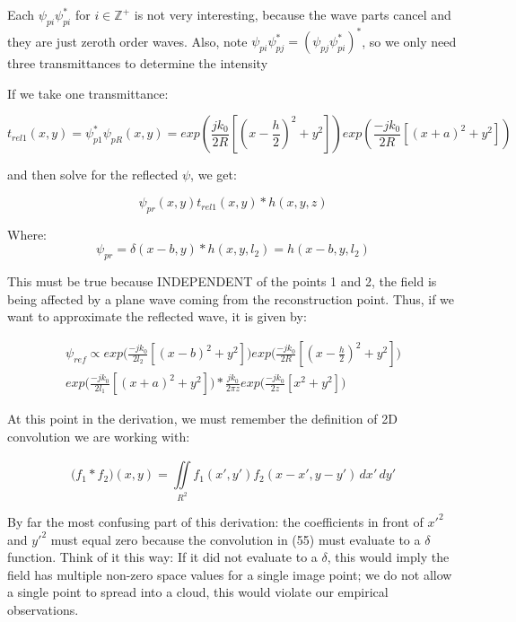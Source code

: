 \documentclass[12pt]{article}
\begin{document}
Each \(\psi_{pi}\psi_{pi}^*\) for \(i \in \mathbb{Z}^+\) is not very interesting, because the wave parts cancel and they are just zeroth order waves.
Also, note \(\psi_{pi}\psi_{pj}^* = (\psi_{pj}\psi_{pi}^*)^* \), so we only need three transmittances to determine the intensity

If we take one transmittance:

\begin{equation}
	t_{rel1}(x,y) = \psi_{p1}^*\psi_{pR}(x,y) = exp(\frac{jk_{0}}{2R}[(x - \frac{h}{2})^2 + y^2])exp(\frac{-jk_{0}}{2R}[(x + a)^2 + y^2])
\end{equation}

and then solve for the reflected \(\psi\), we get:

\begin{equation}
	\psi_{pr}(x,y)t_{rel1}(x,y)*h(x,y,z)
\end{equation}

Where:
\begin{equation}
	\psi_{pr} = \delta(x - b,y)*h(x,y,l_{2}) = h(x - b,y,l_{2})
\end{equation}

This must be true because INDEPENDENT of the points 1 and 2, the field is being
affected by a plane wave coming from the reconstruction point. Thus, if we want to 
approximate the reflected wave, it is given by:

\begin{equation}
	\begin{multlined}
	\psi_{ref} \propto exp\bigg(\frac{-jk_{0}}{2l_{2}}[(x - b)^2 + y^2]\bigg)
	exp\bigg(\frac{-jk_{0}}{2R}[(x - \frac{h}{2})^2 + y^2]\bigg)
	\\exp\bigg(\frac{-jk_{0}}{2l_{1}}[(x + a)^2 + y^2]\bigg)
	*\frac{jk_{0}}{2\pi z}exp\bigg(\frac{-jk_{0}}{2z}[x^2 + y^2]\bigg)
	\end{multlined}
\end{equation}

At this point in the derivation, we must remember the definition of 2D convolution we are working with:

\begin{equation}
	\big(f_{1}*f_{2}\big)(x,y) = \iint \limits_{R^2}^{} f_{1}(x',y')f_{2}(x - x',y - y') \,dx'\,dy'
\end{equation}

By far the most confusing part of this derivation: the coefficients in front of \(x'^2\) and \(y'^2\) must equal zero because the convolution in (55) must evaluate to a \(\delta\) function.
Think of it this way: If it did not evaluate to a \(\delta\), this would imply the field has multiple non-zero space values for a single image point; we do not allow a single point 
to spread into a cloud, this would violate our empirical observations.
\end{document}
